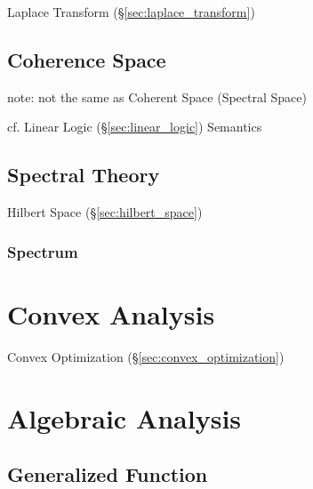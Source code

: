 Laplace Transform (\S\ref{sec:laplace_transform})



\subsection{Coherence Space}\label{sec:coherence_space}

note: not the same as Coherent Space (Spectral Space)

cf. Linear Logic (\S\ref{sec:linear_logic}) Semantics



\subsection{Spectral Theory}\label{sec:spectral_theory}

Hilbert Space (\S\ref{sec:hilbert_space})



\subsubsection{Spectrum}\label{sec:spectrum}



\section{Convex Analysis}\label{sec:convex_analysis}

Convex Optimization (\S\ref{sec:convex_optimization})



\section{Algebraic Analysis}\label{sec:algebraic_analysis}

\subsection{Generalized Function}\label{sec:generalized_function}

